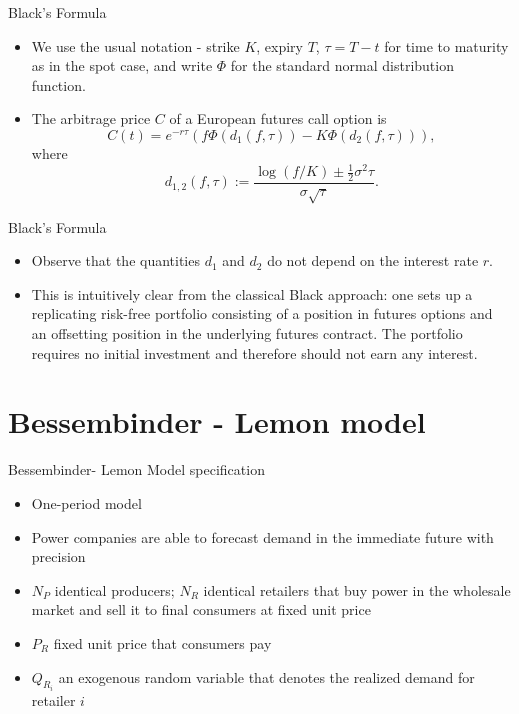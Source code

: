 {Black's Formula}

\begin{itemize}
\item<1-> We use the usual notation -
strike $K$, expiry $T$, $\tau=T-t$ for time to maturity as in the spot case, and write $\Phi$ for the
standard normal distribution function.
\item<2->
The arbitrage price $C$ of a European futures call option is
\begin{equation}\label{Black}
C(t)= e^{-r\tau} (f \Phi(d_1 (f,\tau)) - K \Phi(d_2 (f,\tau))),
\end{equation}
where
$$
d_{1,2} (f,\tau) := \frac{\log (f/K) \pm \frac{1}{2} {\sigma}^2 \tau}{
\sigma \sqrt{\tau}}.
$$
\end{itemize}



{Black's Formula}
\begin{itemize}
\item<1->
Observe that the quantities $d_1$ and $d_2$ do not depend on the
interest rate $r$.
\item<2-> This is intuitively clear from the classical
Black approach: one sets up a replicating risk-free portfolio
consisting of a position in futures options and an offsetting
position in the underlying futures contract. The portfolio
requires no initial investment and therefore should not earn any
interest.
\end{itemize}


\section{Bessembinder - Lemon model}

{Bessembinder- Lemon Model specification}
\begin{itemize}
\item<1-> One-period model
\item<2-> Power companies are able to forecast demand in the immediate future with precision
\item<3-> $N_P$ identical producers; $N_R$ identical retailers that buy power in the wholesale market and sell it to final consumers at fixed unit price
\item<4-> $P_R$ fixed unit price that consumers pay
\item<5-> $Q_{R_i}$ an exogenous random variable that denotes the realized demand for retailer $i$
\end{itemize}




